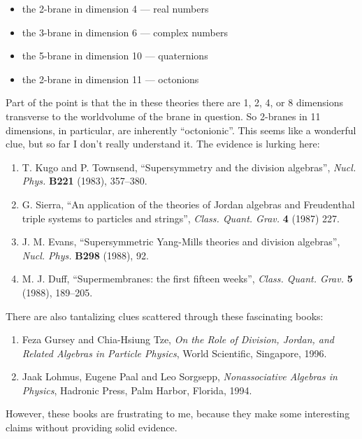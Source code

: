 \documentclass{article}
\def\tightlist{}
\begin{document}
\begin{itemize}
\tightlist
\item
  the 2-brane in dimension 4 --- real numbers
\item
  the 3-brane in dimension 6 --- complex numbers
\item
  the 5-brane in dimension 10 --- quaternions
\item
  the 2-brane in dimension 11 --- octonions
\end{itemize}

Part of the point is that the in these theories there are 1, 2, 4, or 8
dimensions transverse to the worldvolume of the brane in question. So
2-branes in 11 dimensions, in particular, are inherently ``octonionic''.
This seems like a wonderful clue, but so far I don't really understand
it. The evidence is lurking here:

\begin{enumerate}
\def\labelenumi{\arabic{enumi})}
\setcounter{enumi}{4}
\item
  T. Kugo and P. Townsend, ``Supersymmetry and the division algebras'',
  \emph{Nucl. Phys.} \textbf{B221} (1983), 357--380.
\item
  G. Sierra, ``An application of the theories of Jordan algebras and
  Freudenthal triple systems to particles and strings'', \emph{Class.
  Quant. Grav.} \textbf{4} (1987) 227.
\item
  J. M. Evans, ``Supersymmetric Yang-Mills theories and division
  algebras'', \emph{Nucl. Phys.} \textbf{B298} (1988), 92.
\item
  M. J. Duff, ``Supermembranes: the first fifteen weeks'', \emph{Class.
  Quant. Grav.} \textbf{5} (1988), 189--205.
\end{enumerate}

There are also tantalizing clues scattered through these fascinating
books:

\begin{enumerate}
\def\labelenumi{\arabic{enumi})}
\setcounter{enumi}{8}
\item
  Feza Gursey and Chia-Hsiung Tze, \emph{On the Role of Division,
  Jordan, and Related Algebras in Particle Physics}, World Scientific,
  Singapore, 1996.
\item
  Jaak Lohmus, Eugene Paal and Leo Sorgsepp, \emph{Nonassociative
  Algebras in Physics}, Hadronic Press, Palm Harbor, Florida, 1994.
\end{enumerate}

However, these books are frustrating to me, because they make some
interesting claims without providing solid evidence.
\end{document}

